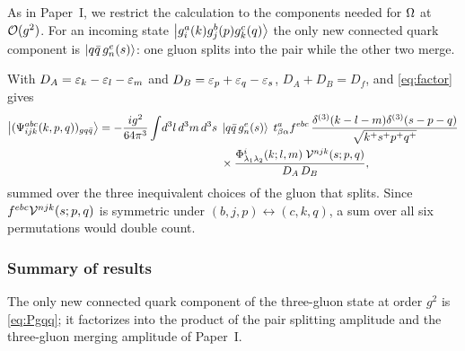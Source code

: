 As in Paper~I, we restrict the calculation to the components needed for $\Omega$ at
$\mathcal{O}(g^{2})$. For an incoming state $\left|g^{a}_{i}(k)g^{b}_{j}(p)g^{c}_{k}(q)\right\rangle$ the only new
connected quark component is $\left|q\bar q\,g^{e}_{n}(s)\right\rangle$: one gluon splits into the pair while
the other two merge.
\begin{center}
\end{center}
With $D_{A}=\varepsilon_{k}-\varepsilon_{l}-\varepsilon_{m}$ and $D_{B}=\varepsilon_{p}+\varepsilon_{q}-\varepsilon_{s}$, $D_{A}+D_{B}=D_{f}$,
and \eqref{eq:factor} gives
\begin{align}
\left|(\Psi^{abc}_{ijk}(k,p,q))_{gq\bar q}\right\rangle=-\frac{ig^{2}}{64\pi^{3}}
\int\!d^{3}l\,d^{3}m\,d^{3}s\;
&\left|q\bar q\,g^{e}_{n}(s)\right\rangle\;t^{a}_{\beta\alpha}f^{ebc}\,
\frac{\delta^{(3)}(k-l-m)\delta^{(3)}(s-p-q)}{\sqrt{k^{+}s^{+}p^{+}q^{+}}}
\nonumber\\&\times
\frac{\Phi^{i}_{\lambda_{1}\lambda_{2}}(k;l,m)\;\mathcal{V}^{njk}(s;p,q)}{D_{A}\,D_{B}} ,
\label{eq:Pgqq}
\end{align}
summed over the three inequivalent choices of the gluon that splits. Since
$f^{ebc}\mathcal{V}^{njk}(s;p,q)$ is symmetric under $(b,j,p)\leftrightarrow(c,k,q)$, a sum over all six
permutations would double count.

\subsubsection{Summary of results}

The only new connected quark component of the three-gluon state at order $g^{2}$ is
\eqref{eq:Pgqq}; it factorizes into the product of the pair splitting amplitude and the
three-gluon merging amplitude of Paper~I.
